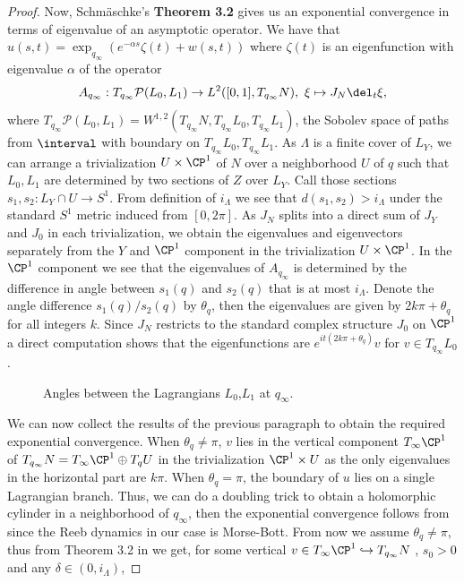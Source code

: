 \begin{proof}
Now, Schm\"aschke's\textbf{ Theorem 3.2} gives us an exponential convergence in terms of eigenvalue of an asymptotic operator. We have that $u(s,t) = \exp _{q_\infty}(e^{-\alpha s}\zeta(t) + w(s,t)) $ where  $\zeta (t)$ is an eigenfunction with eigenvalue $\alpha$ of the operator 
$$A_{q_\infty}:T_{q_\infty}\mathcal{P}(L_0,L_1) \to L^2([0,1],T_{q_\infty} N), \text{      } \xi \mapsto J_N\del_t\xi,$$
where $T_{q_\infty}\mathcal{P}(L_0,L_1) = W^{1,2}(T_{q_\infty}N,T_{q_\infty}L_0,T_{q_\infty}L_1)$, the Sobolev space of paths from $\interval$ with boundary on $T_{q_\infty}L_0,T_{q_\infty}L_1$. As $\Lambda$ is a finite cover of $L_Y$, we can arrange a trivialization $U\times \CP^1$ of $N$ over a neighborhood $U$ of $q$ such that $L_0,L_1$ are determined by two sections of $Z$ over $L_Y$. Call those sections $s_1,s_2 : L_Y \cap U \to S^1$. From definition of $i_\Lambda$ we see that $d(s_1,s_2) > i_\Lambda$ under the standard $S^1$ metric induced from $[0,2\pi]$. As  $J_N$ splits into a direct sum of $J_Y$ and $J_0$ in each trivialization, we obtain the eigenvalues and eigenvectors separately from the $Y$ and $\CP^1$ component in the trivialization $U \times \CP^1$. In the $\CP^1$ component we see that the eigenvalues of $A_{q_\infty}$ is determined by the difference in angle between $s_1(q)$ and $s_2(q)$ that is at most $i_\Lambda$. Denote the angle difference $s_1(q)/s_2(q)$ by $\theta_q$, then the eigenvalues are given by $2k\pi + \theta_q $ for all integers $k$. Since $J_N$ restricts  to the standard complex structure $J_0$ on $\CP^1$ a direct computation shows that the eigenfunctions are $e^{it(2k\pi+\theta_q)}v$ for $v \in T_{q_\infty}L_0$.

\begin{figure}[ht]
    \centering
    \caption{Angles between the Lagrangians $L_0$,$L_1$ at $q_\infty.$}
    \label{fig:lagangle}
\end{figure}



We can now collect the results of the previous paragraph to obtain the required exponential convergence. When $\theta_q \neq \pi$, $v$ lies in the vertical component $T_{\infty}\CP^1$ of $T_{q_\infty}N = T_{\infty}\CP^1 \oplus T_{q}U$ in the trivialization $\CP^1\times U $ as the only eigenvalues in the horizontal part are $k\pi$. When $\theta_q = \pi$, the boundary of $u$ lies on a single Lagrangian branch. Thus, we can do a doubling trick to obtain a holomorphic cylinder in a neighborhood of $q_\infty$, then the exponential convergence  follows from \cite{bourg} since the Reeb dynamics in our case is Morse-Bott. From now we assume $\theta_q \neq \pi$, thus from Theorem 3.2 in \cite{schm} we get, for some vertical $v\in T_{\infty}\CP^1 \hookrightarrow T_{q_\infty}N  $ , $s_0>0$  and any $\delta \in (0,i_\Lambda)$,


\end{proof}
